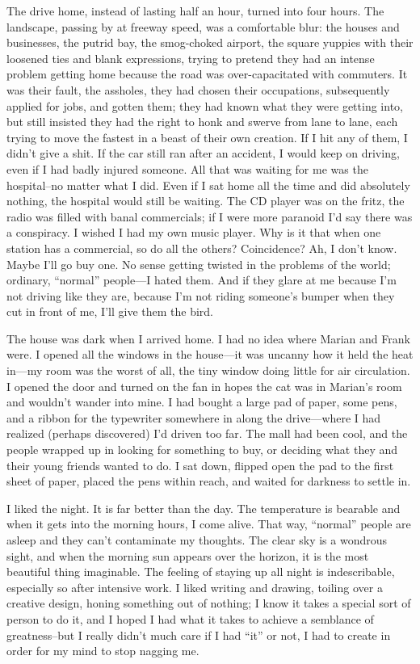 The drive home, instead of lasting half an hour, turned into four hours.
The landscape, passing by at freeway speed, was a comfortable blur: the
houses and businesses, the putrid bay, the smog-choked airport, the
square yuppies with their loosened ties and blank expressions, trying to
pretend they had an intense problem getting home because the road was
over-capacitated with commuters. It was their fault, the assholes, they
had chosen their occupations, subsequently applied for jobs, and gotten
them; they had known what they were getting into, but still insisted
they had the right to honk and swerve from lane to lane, each trying to
move the fastest in a beast of their own creation. If I hit any of them,
I didn't give a shit. If the car still ran after an accident, I would
keep on driving, even if I had badly injured someone. All that was
waiting for me was the hospital--no matter what I did. Even if I sat
home all the time and did absolutely nothing, the hospital would still
be waiting. The CD player was on the fritz, the radio was filled with
banal commercials; if I were more paranoid I'd say there was a
conspiracy. I wished I had my own music player. Why is it that when one
station has a commercial, so do all the others? Coincidence? Ah, I don't
know. Maybe I'll go buy one. No sense getting twisted in the problems of
the world; ordinary, ``normal'' people---I hated them. And if they glare
at me because I'm not driving like they are, because I'm not riding
someone's bumper when they cut in front of me, I'll give them the bird.

The house was dark when I arrived home. I had no idea where Marian and
Frank were. I opened all the windows in the house---it was uncanny how
it held the heat in---my room was the worst of all, the tiny window
doing little for air circulation. I opened the door and turned on the
fan in hopes the cat was in Marian's room and wouldn't wander into mine.
I had bought a large pad of paper, some pens, and a ribbon for the
typewriter somewhere in along the drive---where I had realized (perhaps
discovered) I'd driven too far. The mall had been cool, and the people
wrapped up in looking for something to buy, or deciding what they and
their young friends wanted to do. I sat down, flipped open the pad to
the first sheet of paper, placed the pens within reach, and waited for
darkness to settle in.

I liked the night. It is far better than the day. The temperature is
bearable and when it gets into the morning hours, I come alive. That
way, ``normal'' people are asleep and they can't contaminate my
thoughts. The clear sky is a wondrous sight, and when the morning sun
appears over the horizon, it is the most beautiful thing imaginable. The
feeling of staying up all night is indescribable, especially so after
intensive work. I liked writing and drawing, toiling over a creative
design, honing something out of nothing; I know it takes a special sort
of person to do it, and I hoped I had what it takes to achieve a
semblance of greatness--but I really didn't much care if I had ``it'' or
not, I had to create in order for my mind to stop nagging me.

